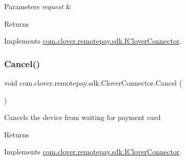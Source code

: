 \begin{DoxyParams}{Parameters}
{\em request} & \\
\hline
\end{DoxyParams}
\begin{DoxyReturn}{Returns}

\end{DoxyReturn}


Implements \hyperlink{interfacecom_1_1clover_1_1remotepay_1_1sdk_1_1_i_clover_connector_af0099cbd3075f3c91f6873265f9c766b}{com.\+clover.\+remotepay.\+sdk.\+I\+Clover\+Connector}.

\mbox{\label{classcom_1_1clover_1_1remotepay_1_1sdk_1_1_clover_connector_a6ca6015f34bf85df7d4242add5751606}} 
\subsubsection{\texorpdfstring{Cancel()}{Cancel()}}
{\footnotesize\ttfamily void com.\+clover.\+remotepay.\+sdk.\+Clover\+Connector.\+Cancel (\begin{DoxyParamCaption}{ }\end{DoxyParamCaption})}



Cancels the device from waiting for payment card 

\begin{DoxyReturn}{Returns}

\end{DoxyReturn}


Implements \hyperlink{interfacecom_1_1clover_1_1remotepay_1_1sdk_1_1_i_clover_connector_abbb999130d903a88e806c7b396c743f7}{com.\+clover.\+remotepay.\+sdk.\+I\+Clover\+Connector}.

\mbox{\label{classcom_1_1clover_1_1remotepay_1_1sdk_1_1_clover_connector_a7323abfe34b1fee5634dd7e1296633cb}} 
